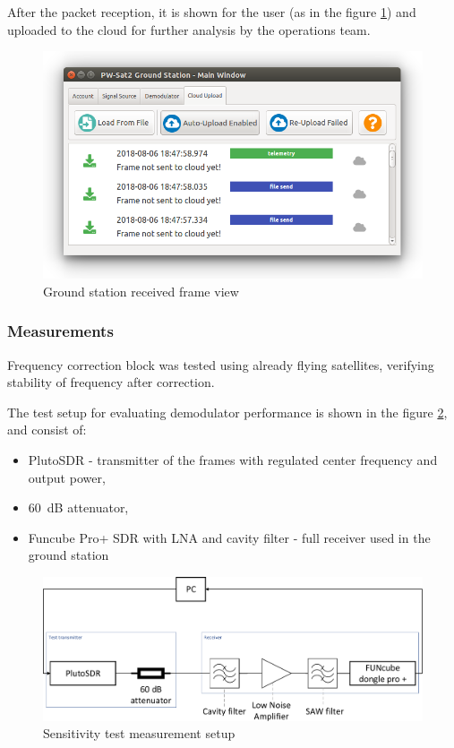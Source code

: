 After the packet reception, it is shown for the user (as in the figure \ref{gs_frame_view}) and uploaded to the cloud for further analysis by the operations team.

\begin{figure}
    \centering
    \includegraphics[width=0.6\paperwidth]{img/7/gs_frame_view.png}
    \caption{Ground station received frame view}
    \label{gs_frame_view}
\end{figure}


\subsubsection{Measurements}
Frequency correction block was tested using already flying satellites, verifying stability of frequency after correction.

The test setup for evaluating demodulator performance is shown in the figure \ref{sensitivity_test_diagram}, and consist of:
\begin{itemize}
    \item PlutoSDR - transmitter of the frames with regulated center frequency and output power,
    \item \SI{60}{\dB} attenuator,
    \item Funcube Pro+ SDR with LNA and cavity filter - full receiver used in the ground station
\end{itemize}

\begin{figure}
    \centering
    \includegraphics[width=0.8\paperwidth]{img/7/sensitivity_test_diagram.pdf}
    \caption{Sensitivity test measurement setup}
    \label{sensitivity_test_diagram}
\end{figure}

